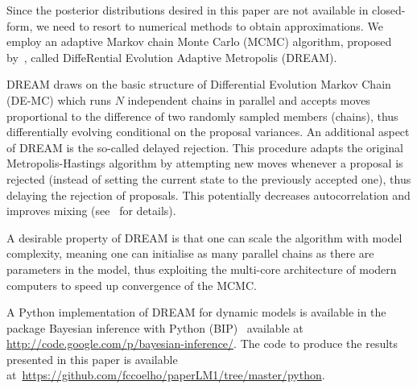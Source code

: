 \documentclass[a4paper,10pt]{article}
\begin{document}
Since the posterior distributions desired in this paper are not available in 
closed-form, we need to resort to numerical methods to obtain approximations.
We employ an adaptive Markov chain Monte Carlo (MCMC) algorithm, proposed
by~\cite{vrugt2008}, called  DiffeRential Evolution Adaptive Metropolis (DREAM).

DREAM draws on the basic structure of Differential Evolution Markov Chain 
(DE-MC) which runs $N$ independent chains in parallel and accepts moves 
proportional to the difference of two randomly sampled members (chains), thus 
differentially evolving conditional on the proposal variances.
An additional aspect of DREAM is the so-called delayed rejection.
This procedure adapts the original Metropolis-Hastings algorithm by attempting 
new moves whenever a proposal is rejected (instead of setting the current state 
to the previously accepted one), thus delaying the rejection of proposals. 
This potentially decreases autocorrelation and improves mixing 
(see~\cite{mira2001} for details). 

A desirable property of DREAM is that one can scale the algorithm with model 
complexity, meaning one can initialise as many parallel chains as there are 
parameters in the model, thus exploiting the multi-core architecture of modern 
computers to speed up convergence of the MCMC.

A Python implementation of DREAM for dynamic models is available in the package 
Bayesian inference with Python (BIP)~\cite{pone2011} available at 
\url{http://code.google.com/p/bayesian-inference/}.
The code to produce the results presented in this paper is available 
at~\url{https://github.com/fccoelho/paperLM1/tree/master/python}.
\end{document}
